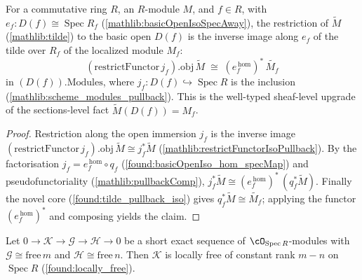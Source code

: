 \begin{lemma}
  \label{found:tilde_restrict_basicOpen}
  For a commutative ring \(R\), an \(R\)-module \(M\), and \(f\in R\), with
  \(e_f:D(f)\cong\operatorname{Spec}R_f\) (\cref{mathlib:basicOpenIsoSpecAway}), the
  restriction of \(\widetilde M\) (\cref{mathlib:tilde}) to the basic open \(D(f)\) is
  the inverse image along \(e_f\) of the tilde over \(R_f\) of the localized module
  \(M_f\):
  \[
    (\mathrm{restrictFunctor}\,j_f).\mathrm{obj}\,\widetilde M\;\cong\;
    (e_f^{\,\mathrm{hom}})^{*}\,\widetilde{M_f}
  \]
  in \((D(f)).\mathrm{Modules}\), where \(j_f:D(f)\hookrightarrow\operatorname{Spec}R\)
  is the inclusion (\cref{mathlib:scheme_modules_pullback}).  This is the well-typed
  sheaf-level upgrade of the sections-level fact \(\widetilde M(D(f))=M_f\).
\end{lemma}

\begin{proof}
  Restriction along the open immersion \(j_f\) is the inverse image
  \((\mathrm{restrictFunctor}\,j_f).\mathrm{obj}\,\widetilde M\cong j_f^{*}\widetilde M\)
  (\cref{mathlib:restrictFunctorIsoPullback}).  By the factorisation
  \(j_f=e_f^{\,\mathrm{hom}}\circ q_f\) (\cref{found:basicOpenIso_hom_specMap}) and
  pseudofunctoriality (\cref{mathlib:pullbackComp}),
  \(j_f^{*}\widetilde M\cong(e_f^{\,\mathrm{hom}})^{*}\,(q_f^{*}\widetilde M)\).
  Finally the novel core (\cref{found:tilde_pullback_iso}) gives
  \(q_f^{*}\widetilde M\cong\widetilde{M_f}\); applying the functor
  \((e_f^{\,\mathrm{hom}})^{*}\) and composing yields the claim.
\end{proof}

\begin{lemma}
  \label{lem:isLocallyFree_kernel_on_affine}
  Let \(0\to\mathcal K\to\mathcal G\to\mathcal H\to 0\) be a short exact sequence
  of \(\cO_{\operatorname{Spec}R}\)-modules with \(\mathcal G\cong\mathrm{free}\,m\)
  and \(\mathcal H\cong\mathrm{free}\,n\).  Then \(\mathcal K\) is locally free of
  constant rank \(m-n\) on \(\operatorname{Spec}R\) (\cref{found:locally_free}).
\end{lemma}

